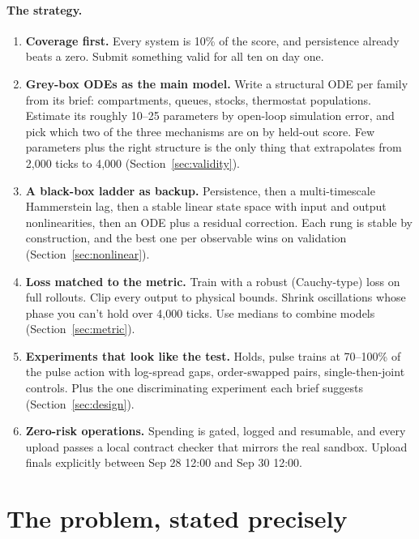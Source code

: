\documentclass[11pt]{article}
\theoremstyle{plain}
\theoremstyle{definition}
\theoremstyle{remark}
\begin{document}
\paragraph{The strategy.}
\begin{enumerate}
\item \textbf{Coverage first.} Every system is 10\% of the score, and persistence already beats a zero. Submit something valid for all ten on day one.
\item \textbf{Grey-box ODEs as the main model.} Write a structural ODE per family from its brief: compartments, queues, stocks, thermostat populations. Estimate its roughly 10--25 parameters by open-loop simulation error, and pick which two of the three mechanisms are on by held-out score. Few parameters plus the right structure is the only thing that extrapolates from 2,000 ticks to 4,000 (Section~\ref{sec:validity}).
\item \textbf{A black-box ladder as backup.} Persistence, then a multi-timescale Hammerstein lag, then a stable linear state space with input and output nonlinearities, then an ODE plus a residual correction. Each rung is stable by construction, and the best one per observable wins on validation (Section~\ref{sec:nonlinear}).
\item \textbf{Loss matched to the metric.} Train with a robust (Cauchy-type) loss on full rollouts. Clip every output to physical bounds. Shrink oscillations whose phase you can't hold over 4,000 ticks. Use medians to combine models (Section~\ref{sec:metric}).
\item \textbf{Experiments that look like the test.} Holds, pulse trains at 70--100\% of the pulse action with log-spread gaps, order-swapped pairs, single-then-joint controls. Plus the one discriminating experiment each brief suggests (Section~\ref{sec:design}).
\item \textbf{Zero-risk operations.} Spending is gated, logged and resumable, and every upload passes a local contract checker that mirrors the real sandbox. Upload finals explicitly between Sep 28 12:00 and Sep 30 12:00.
\end{enumerate}

\section{The problem, stated precisely}\label{sec:setup}
\end{document}
